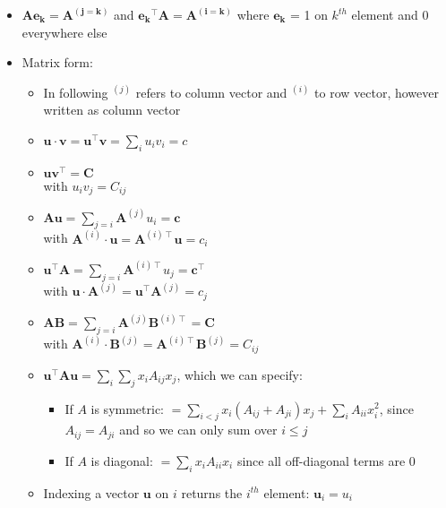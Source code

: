 \begin{itemize}
    \item $\boldsymbol{A} \boldsymbol{e_k} = \boldsymbol{A^{(j=k)}}$ and $\boldsymbol{e_k}^\intercal \boldsymbol{A} = \boldsymbol{A^{(i=k)}}$ where $\boldsymbol{e_k}$ = 1 on $k^{th}$ element and 0 everywhere else
    \item Matrix form:
    \begin{itemize}
        \item In following $^{(j)}$ refers to column vector and $^{(i)}$ to row vector, however written as column vector
        \item $\boldsymbol{u} \cdot \boldsymbol{v} = \boldsymbol{u}^\intercal \boldsymbol{v} = \sum_i u_i v_i = c$
        \item $\boldsymbol{u} \boldsymbol{v}^\intercal = \boldsymbol{C}$\\
        with $u_i v_j = C_{ij}$
        \item $\boldsymbol{A} \boldsymbol{u} = \sum_{j=i} \boldsymbol{A}^{(j)} u_i = \boldsymbol{c}$\\
        with $\boldsymbol{A}^{(i)} \cdot \boldsymbol{u} = \boldsymbol{A}^{(i) \intercal} \boldsymbol{u} = c_i$
        \item $\boldsymbol{u}^\intercal \boldsymbol{A} = \sum_{j=i} \boldsymbol{A}^{(i) \intercal} u_j = \boldsymbol{c}^\intercal$\\
        with $\boldsymbol{u} \cdot \boldsymbol{A}^{(j)} = \boldsymbol{u}^\intercal \boldsymbol{A}^{(j)} = c_j$
        \item $\boldsymbol{A} \boldsymbol{B} = \sum_{j=i} \boldsymbol{A}^{(j)} \boldsymbol{B}^{(i) \intercal} = \boldsymbol{C}$\\
        with $\boldsymbol{A}^{(i)} \cdot \boldsymbol{B}^{(j)} = \boldsymbol{A}^{(i) \intercal} \boldsymbol{B}^{(j)} = C_{ij}$
        \item $\boldsymbol{u}^\intercal \boldsymbol{A} \boldsymbol{u} = \sum_i \sum_j x_i A_{ij} x_j$, which we can specify:
        \begin{itemize}
            \item If $A$ is symmetric: $= \sum_{i < j} x_i (A_{ij} + A_{ji}) x_j + \sum_{i} A_{ii} x_i^2$, since $ A_{ij} =  A_{ji}$ and so we can only sum over $i \leq j$
            \item If $A$ is diagonal: $= \sum_i x_i A_{ii} x_i$ since all off-diagonal terms are $0$
        \end{itemize}
        \item Indexing a vector $\boldsymbol{u}$ on $i$ returns the $i^{th}$ element: $\boldsymbol{u}_i = u_i$

\end{itemize}
\end{itemize}
